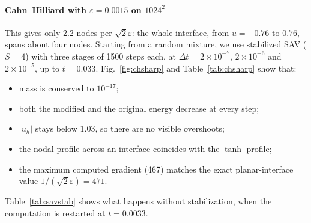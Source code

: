 \documentclass[preprint,12pt]{elsarticle}
\theoremstyle{remark}
\begin{document}
\paragraph{Cahn--Hilliard with $\varepsilon=0.0015$ on $1024^2$} This gives only 2.2 nodes per
$\sqrt2\varepsilon$: the whole interface, from $u=-0.76$ to $0.76$, spans about four nodes. Starting from a
random mixture, we use stabilized SAV ($S=4$) with three stages of 1500 steps each, at
$\Delta t=2\times10^{-7}$, $2\times10^{-6}$ and $2\times10^{-5}$, up to $t=0.033$.
Fig.~\ref{fig:chsharp} and Table~\ref{tab:chsharp} show that:
\begin{itemize}
\item mass is conserved to $10^{-17}$;
\item both the modified and the original energy decrease at every step;
\item $|u_h|$ stays below 1.03, so there are no visible overshoots;
\item the nodal profile across an interface coincides with the $\tanh$ profile;
\item the maximum computed gradient (467) matches the exact planar-interface value $1/(\sqrt2\varepsilon)=471$.
\end{itemize}
Table~\ref{tab:savstab} shows what happens without stabilization, when the computation is restarted at
$t=0.0033$.
\end{document}
